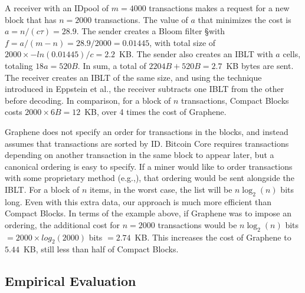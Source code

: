  A receiver with an IDpool of $m=4000$ transactions
makes a request for a new block that has $n=2000$ transactions. The
value of $a$ that minimizes the cost is $a=n/(c\tau)=28.9$. The sender
creates a Bloom filter \S with $f=a/(m-n)=28.9/2000= 0.01445$,
with total size of $2000\times -ln(0.01445)/c=2.2$~KB.  The
sender also creates an IBLT with $a$ cells, totaling $18a=520B$. In
sum, a total of $2204B+520B=2.7$~KB bytes are sent.  The receiver
creates an IBLT of the same size, and using the technique introduced
in Eppstein et al.\cite{eppstein:2011}, the receiver subtracts one
IBLT from the other before decoding. In comparison, for a block of $n$ transactions, Compact Blocks costs $2000\times6B = 12$~KB, over 4 times the cost of Graphene. 

 Graphene does not specify an order for transactions
in the blocks, and instead assumes that transactions are sorted by
ID. Bitcoin Core requires transactions depending on another transaction in
the same block to appear later, but a canonical ordering is easy to
specify. If a miner would like to order transactions with some
proprietary method (e.g.,\cite{Hanke:2016}), that ordering would be
sent alongside the IBLT. For a block of $n$ items, in the worst case,
the list will be $n\log_2(n)$ bits long.  Even with this extra data, our approach is much more efficient than Compact Blocks.   In terms of the example above, if Graphene was to impose an ordering, the additional cost for $n=2000$ transactions would be $n \log_2(n)$ bits $= 2000\times log_2(2000)$ bits $= 2.74$~KB. This increases the cost of Graphene to $5.44$~KB, still less than half of Compact Blocks.



\subsection{Empirical Evaluation}

